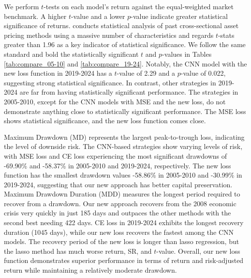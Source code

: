 \documentclass[preprint,12pt,numafflabel,authoryear]{elsarticle}
\begin{document}


We perform $t$-tests on each model's return against the equal-weighted market benchmark. A higher $t$-value and a lower $p$-value indicate greater statistical significance of returns. \citet{chen2021open} conducts statistical analysis of past cross-sectional asset pricing methods using a massive number of characteristics and regards $t$-stats greater than 1.96 as a key indicator of statistical significance. We follow the same standard and bold the statistically significant $t$ and $p$-values in Tables \ref{tab:compare_05-10} and \ref{tab:compare_19-24}. Notably, the CNN model with the new loss function in 2019-2024 has a $t$-value of 2.29 and a $p$-value of 0.022, suggesting strong statistical significance. In contrast, other strategies in 2019-2024 are far from having statistically significant performance. The strategies in 2005-2010, except for the CNN models with MSE and the new loss, do not demonstrate anything close to statistically significant performance. The MSE loss shows statistical significance, and the new loss function comes close.

Maximum Drawdown (MD) represents the largest peak-to-trough loss, indicating the level of downside risk. The CNN-based strategies show varying levels of risk, with MSE loss and CE loss experiencing the most significant drawdowns of -69.90\% and -58.37\% in 2005-2010 and 2019-2024, respectively. The new loss function has the smallest drawdown values -58.86\% in 2005-2010 and -30.99\% in 2019-2024, suggesting that our new approach has better capital preservation. Maximum Drawdown Duration (MDD) measures the longest period required to recover from a drawdown. Our new approach recovers from the 2008 economic crisis very quickly in just 185 days and outpaces the other methods with the second best needing 422 days. CE loss in 2019-2024 exhibits the longest recovery duration (1045 days), while our new loss recovers the fastest among the CNN models. The recovery period of the new loss is longer than lasso regression, but the lasso method has much worse return, SR, and $t$-value. Overall, our new loss function demonstrates superior performance in terms of return and risk-adjusted return while maintaining a relatively moderate drawdown.
\end{document}
